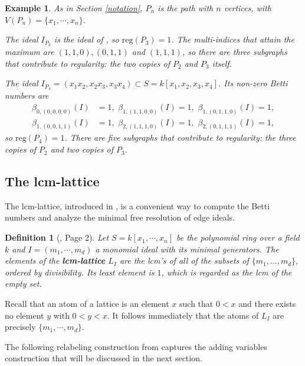 \documentclass[dvipsnames,10pt]{article}
\newtheorem{defi}[theorem]{Definition}
\newtheorem{example}[theorem]{Example}
\begin{document}
\begin{example}
    As in Section \ref{notation}, $P_n$ is the path with $n$ vertices, with $V(P_n)=\{x_1,\cdots,x_n\}$.

    The ideal $I_{P_3}$ is the ideal of , so $\mathrm{reg}(P_3)=1$. The multi-indices that attain the maximum are $(1,1,0),(0,1,1)$ and $(1,1,1)$, so there are three subgraphs that contribute to regularity: the two copies of $P_2$ and $P_3$ itself.

    The ideal $I_{P_4}=(x_1x_2,x_2x_3,x_3x_4)\subset S=k[x_1,x_2,x_3,x_4]$. Its non-zero Betti numbers are
    \begin{align*}
        \beta_{0,(0,0,0,0)}(I)& = 1,\,\,\beta_{1,(1,1,0,0)}(I) = 1,\,\,\beta_{1,(0,1,1,0)}(I) = 1,\\\beta_{1,(0,0,1,1)}(I) &= 1,\,\,\beta_{2,(1,1,1,0)}(I) = 1,\,\, \beta_{2,(0,1,1,1)}(I) = 1,
    \end{align*}
    so $\mathrm{reg}(P_4)=1$. There are five subgraphs that contribute to regularity: the three copies of $P_2$ and two copies of $P_3$.
\end{example}

\subsection{The lcm-lattice}

The lcm-lattice, introduced in \cite{welker1999lcm}, is a convenient way to compute the Betti numbers and analyze the minimal free resolution of edge ideals.

\begin{defi}[\cite{welker1999lcm}, Page 2]
    Let $S=k[x_1,\cdots,x_n]$ be the polynomial ring over a field $k$ and $I=(m_1,\cdots, m_d)$ a monomial ideal with its minimal generators. The elements of the \textbf{lcm-lattice} $L_I$ are the lcm's of all of the subsets of $\{m_1,... ,m_d\}$, ordered by divisibility. Its least element is $1$, which is regarded as the lcm of the empty set.
\end{defi}

Recall that an atom of a lattice is an element $x$ such that $0<x$ and there exists no element $y$ with $0<y<x$. It follows immediately that the atoms of $L_I$ are precisely $\{m_1,\cdots,m_d\}$.

The following relabeling construction from \cite{welker1999lcm} captures the adding variables construction that will be discussed in the next section.
\end{document}

